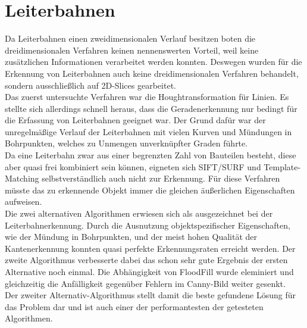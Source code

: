 \section{Leiterbahnen}
Da Leiterbahnen einen zweidimensionalen Verlauf besitzen boten die dreidimensionalen Verfahren keinen nennenswerten Vorteil, weil keine zusätzlichen Informationen verarbeitet werden konnten. Deswegen wurden für die Erkennung von Leiterbahnen auch keine dreidimensionalen Verfahren behandelt, sondern ausschließlich auf 2D-Slices gearbeitet. \\
Das zuerst untersuchte Verfahren war die Houghtransformation für Linien. Es stellte sich allerdings schnell heraus, dass die Geradenerkennung nur bedingt für die Erfassung von Leiterbahnen geeignet war. Der Grund dafür war der unregelmäßige Verlauf der Leiterbahnen mit vielen Kurven und Mündungen in Bohrpunkten, welches zu Unmengen unverknüpfter Graden führte. \\
Da eine Leiterbahn zwar aus einer begrenzten Zahl von Bauteilen besteht, diese aber quasi frei kombiniert sein können, eigneten sich SIFT/SURF und Template-Matching selbstverständlich auch nicht zur Erkennung. Für diese Verfahren müsste das zu erkennende Objekt immer die gleichen äußerlichen Eigenschaften aufweisen. \\
Die zwei alternativen Algorithmen erwiesen sich als ausgezeichnet bei der Leiterbahnerkennung. Durch die Ausnutzung objektspezifischer Eigenschaften, wie der Mündung in Bohrpunkten, und der meist hohen Qualität der Kantenerkennung konnten quasi perfekte Erkennungsraten erreicht werden. Der zweite Algorithmus verbesserte dabei das schon sehr gute Ergebnis der ersten Alternative noch einmal. Die Abhängigkeit von FloodFill wurde eleminiert und gleichzeitig die Anfälligkeit gegenüber Fehlern im Canny-Bild weiter gesenkt. \\
Der zweiter Alternativ-Algorithmus stellt damit die beste gefundene Lösung für das Problem dar und ist auch einer der performantesten der getesteten Algorithmen.
